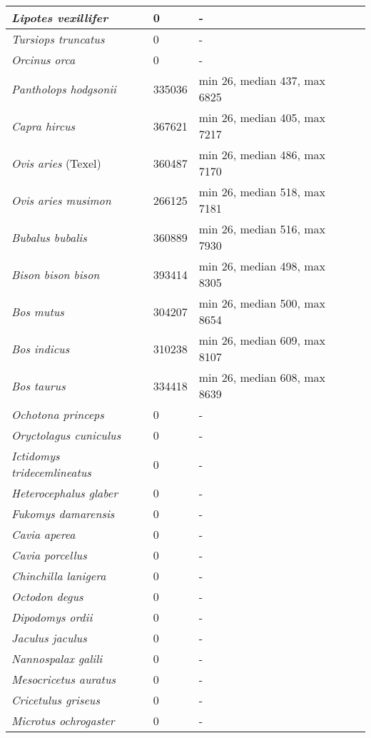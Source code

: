 {\begin{longtable}{| L{4cm} | L{2cm}  | L{5cm} | L{4cm} |}
\textit{Lipotes vexillifer} & 0 & - & \\ \hline
\textit{Tursiops truncatus} & 0 & - & \\ \hline
\textit{Orcinus orca} & 0 & - & \\ \hline
\textit{Pantholops hodgsonii} & 335036 & min 26, median 437, max 6825 & \\ \hline
\textit{Capra hircus} & 367621 & min 26, median 405, max 7217 & \\ \hline
\textit{Ovis aries} (Texel) & 360487 & min 26, median 486, max 7170 & \\ \hline
\textit{Ovis aries musimon} & 266125 & min 26, median 518, max 7181 & \\ \hline
\textit{Bubalus bubalis} & 360889 & min 26, median 516, max 7930 & \\ \hline
\textit{Bison bison bison} & 393414 & min 26, median 498, max 8305 & \\ \hline
\textit{Bos mutus} & 304207 & min 26, median 500, max 8654 & \\ \hline
\textit{Bos indicus} & 310238 & min 26, median 609, max 8107 & \\ \hline
\textit{Bos taurus} & 334418 & min 26, median 608, max 8639 & \\ \hline
\textit{Ochotona princeps} & 0 & - & \\ \hline
\textit{Oryctolagus cuniculus} & 0 & - & \\ \hline
\textit{Ictidomys tridecemlineatus} & 0 & - & \\ \hline
\textit{Heterocephalus glaber} & 0 & - & \\ \hline
\textit{Fukomys damarensis} & 0 & - & \\ \hline
\textit{Cavia aperea} & 0 & - & \\ \hline
\textit{Cavia porcellus} & 0 & - & \\ \hline
\textit{Chinchilla lanigera} & 0 & - & \\ \hline
\textit{Octodon degus} & 0 & - & \\ \hline
\textit{Dipodomys ordii} & 0 & - & \\ \hline
\textit{Jaculus jaculus} & 0 & - & \\ \hline
\textit{Nannospalax galili} & 0 & - & \\ \hline
\textit{Mesocricetus auratus} & 0 & - & \\ \hline
\textit{Cricetulus griseus} & 0 & - & \\ \hline
\textit{Microtus ochrogaster} & 0 & - & \\ \hline

\end{longtable}}
